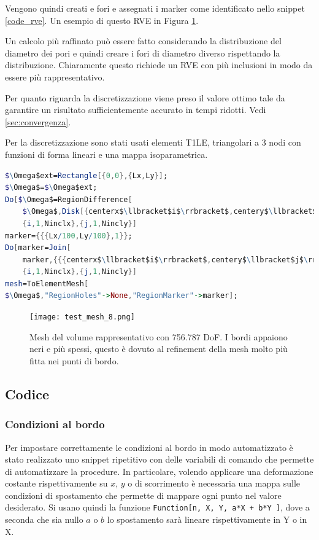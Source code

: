 \documentclass[a4paper,num-refs]{oup-contemporary}
\begin{document}
Vengono quindi creati e fori e assegnati i marker come identificato nello snippet \ref{code_rve}.  Un esempio di questo RVE in Figura \ref{fig:Mesh}.

Un calcolo più raffinato può essere fatto considerando la distribuzione del diametro dei pori \citep{Doktor:2011} e quindi creare i fori di diametro diverso rispettando la distribuzione. Chiaramente questo richiede un RVE con più inclusioni in modo da essere più rappresentativo. 

Per quanto riguarda la discretizzazione viene preso il valore ottimo tale da garantire un risultato sufficientemente accurato in tempi ridotti. Vedi \cref{sec:convergenza}.

Per la discretizzazione sono stati usati elementi T1LE, triangolari a 3 nodi con funzioni di forma lineari e una mappa isoparametrica.  

\begin{lstlisting}[language=Mathematica,caption=Generazione RVE,label=code_rve]
$\Omega$ext=Rectangle[{0,0},{Lx,Ly}];
$\Omega$=$\Omega$ext;
Do[$\Omega$=RegionDifference[
	$\Omega$,Disk[{centerx$\llbracket$i$\rrbracket$,centery$\llbracket$j$\rrbracket$},{Rc,Rc}]],
	{i,1,Ninclx},{j,1,Nincly}]
marker={{{Lx/100,Ly/100},1}};
Do[marker=Join[
	marker,{{{centerx$\llbracket$i$\rrbracket$,centery$\llbracket$j$\rrbracket$},2}}],
	{i,1,Ninclx},{j,1,Nincly}]
mesh=ToElementMesh[
$\Omega$,"RegionHoles"->None,"RegionMarker"->marker];	

\end{lstlisting}


\begin{figure}[bt!]%
	\centering
	\texttt{[image: test\_mesh\_8.png]}
	\caption{Mesh del volume rappresentativo con 756.787 DoF. I bordi appaiono neri e più spessi, questo è dovuto al refinement della mesh molto più fitta nei punti di bordo.}\label{fig:Mesh}
\end{figure}



\subsection{Codice}

\subsubsection{Condizioni al bordo}

Per impostare correttamente le condizioni al bordo in modo automatizzato è stato realizzato uno snippet ripetitivo con delle variabili di comando che permette di automatizzare la procedure. In particolare, volendo applicare una deformazione costante rispettivamente su $x$, $y$ o  di scorrimento è necessaria una mappa sulle condizioni di spostamento che permette di mappare ogni punto  nel valore desiderato. Si usano quindi la funzione \texttt{Function[{n, X, Y}, a*X + b*Y ]}, dove a seconda che sia nullo $a$ o $b$ lo spostamento sarà lineare rispettivamente in Y o in X. 
\end{document}
